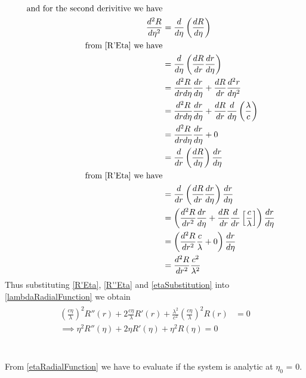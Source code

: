 \documentclass[10pt]{article}
\numberwithin{equation}{section}
\begin{document}
		\begin{align}\label{R''Eta}
			\begin{split}
			\text{and for the second derivitive we have}\\
				\frac{d^2R}{d \eta^2} &= \frac{d}{d \eta} \left(\frac{dR}{d \eta}\right)\\
				\text{from \ref{R'Eta} we have}\\
				&= \frac{d}{d \eta} \left(\frac{dR}{dr} \frac{dr}{d \eta} \right)\\
				&= \frac{d^2 R}{dr d \eta} \frac{dr}{d \eta} + \frac{dR}{dr} \frac{d^2 r}{d \eta^2}\\
				&= \frac{d^2 R}{dr d \eta} \frac{dr}{d \eta} + \frac{dR}{dr} \frac{d}{d \eta} \left(\frac{\lambda}{c}\right)\\
				&= \frac{d^2 R}{dr d \eta} \frac{dr}{d \eta} + 0\\
				&= \frac{d}{dr} \left(\frac{dR}{d \eta}\right) \frac{dr}{d \eta}\\
				\text{from \ref{R'Eta} we have}\\
				&= \frac{d}{dr} \left(\frac{dR}{dr} \frac{dr}{d \eta}\right) \frac{dr}{d \eta}\\
				&= \left(\frac{d^2 R}{dr^2} \frac{dr}{d \eta} + \frac{dR}{dr} \frac{d}{dr} \left[\frac{c}{\lambda}\right]\right) \frac{dr}{d \eta}\\
				&= \left(\frac{d^2 R}{dr^2} \frac{c}{\lambda} + 0 \right) \frac{dr}{d \eta}\\
				&= \frac{d^2 R}{dr^2} \frac{c^2}{\lambda^2}\\
			\end{split}
		\end{align}	
		Thus substituting \ref{R'Eta}, \ref{R''Eta} and \ref{etaSubstitution} into \ref{lambdaRadialFunction} we obtain
		\begin{align}\label{etaRadialFunction}
			\begin{split}
			\left(\frac{c \eta}{\lambda}\right)^2 R''(r) + 2 \frac{c \eta}{\lambda} R'(r) + \frac{\lambda^2}{c^2} \left(\frac{c \eta}{\lambda}\right)^2 R(r) &= 0\\
			\implies \eta^2 R''(\eta) + 2 \eta R'(\eta) + \eta^2 R(\eta) = 0
			\end{split}	
		\end{align}		
		\section{}	
		From \ref{etaRadialFunction} we have to evaluate if the system is analytic at \(\eta_0\) = 0.
		
\end{document}
